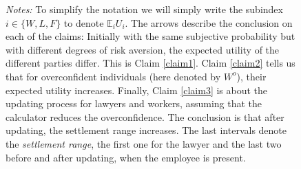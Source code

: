 \begin{figure}[H]
\begin{center}
 \end{center}

\scriptsize
    \textit{Notes:} 
    To simplify the notation we will simply write the subindex $i\in \lbrace W, L , F\rbrace$ to denote $\mathbb{E}_iU_i$. The arrows describe the conclusion on each of the claims: Initially with the same subjective probability but with different degrees of risk aversion, the expected utility of the different parties differ. This is Claim \ref{claim1}. Claim \ref{claim2} tells us that for overconfident individuals (here denoted by $W^o$), their expected utility increases. Finally, Claim \ref{claim3} is about the updating process for lawyers and workers, assuming that the calculator reduces the overconfidence. The conclusion is that after updating, the settlement range increases.  The last intervals denote the \emph{settlement range}, the first one for the lawyer and the last two before and after updating, when the employee is present. 
\end{figure} 








